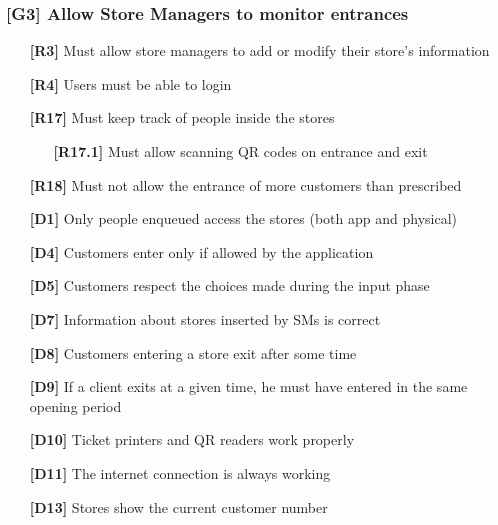 \subsubsection{[G3] Allow Store Managers to monitor entrances}
\begin{itemize}
	\setlength\itemsep{-1mm}
	\item [\textbf{[R3]}] Must allow store managers to add or modify their store’s information
	\item [\textbf{[R4]}] Users must be able to login
	\item [\textbf{[R17]}] Must keep track of people inside the stores
	\begin{itemize}[itemsep=-1mm, topsep=-1mm]
		\item [\textbf{[R17.1]}] Must allow scanning QR codes on entrance and exit
	\end{itemize}
	\item [\textbf{[R18]}] Must not allow the entrance of more customers than prescribed
	\\
	\item [\textbf{[D1]}] Only people enqueued access the stores (both app and physical)
	\item [\textbf{[D4]}] Customers enter only if allowed by the application
	\item [\textbf{[D5]}] Customers respect the choices made during the input phase
	\item [\textbf{[D7]}] Information about stores inserted by SMs is correct
	\item [\textbf{[D8]}] Customers entering a store exit after some time
	\item [\textbf{[D9]}] If a client exits at a given time, he must have entered in the same opening period
	\item [\textbf{[D10]}] Ticket printers and QR readers work properly
	\item [\textbf{[D11]}] The internet connection is always working
	\item [\textbf{[D13]}] Stores show the current customer number
\end{itemize}

